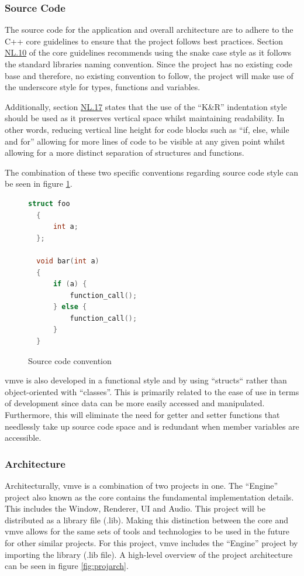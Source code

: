 \documentclass[11pt]{article}
\begin{document}
\subsubsection{Source Code}
The source code for the application and overall architecture are to adhere to
the C++ core guidelines \cite{cpp-guidelines} to ensure that the project follows
best practices. Section
\href{http://isocpp.github.io/CppCoreGuidelines/CppCoreGuidelines#nl10-prefer-underscore_style-names}{NL.10}
of the core guidelines recommends using the snake case style as it follows the
standard libraries naming convention. Since the project has no existing code
base and therefore, no existing convention to follow, the project will make use
of the underscore style for types, functions and variables. 

Additionally, section
\href{https://isocpp.github.io/CppCoreGuidelines/CppCoreGuidelines#nl17-use-kr-derived-layout}{NL.17}
states that the use of the ``K\&R''  indentation style \cite{indentation} should
be used as it preserves vertical space whilst maintaining readability. In other
words, reducing vertical line height for code blocks such as ``if, else, while
and for'' allowing for more lines of code to be visible at any given point
whilst allowing for a more distinct separation of structures and functions.

The combination of these two specific conventions regarding source code style
can be seen in figure \ref{fig:convention}.

\begin{figure}[H]
\centering
\begin{lstlisting}[language=C++]
  struct foo
  {
      int a;
  };

  void bar(int a)
  {
      if (a) {
          function_call();
      } else {
          function_call();
      }
  }
\end{lstlisting}
\caption{Source code convention}
\label{fig:convention}
\end{figure}

\gls*{vmve} is also developed in a functional style and by using ``structs``
rather than object-oriented with ``classes''. This is primarily related to
the ease of use in terms of development since data can be more easily accessed
and manipulated. Furthermore, this will eliminate the need for getter and setter
functions that needlessly take up source code space and is redundant when member
variables are accessible.

\subsubsection{Architecture}
Architecturally, \gls*{vmve} is a combination of two projects in one. The
``Engine'' project also known as the core contains the fundamental
implementation details. This includes the Window, Renderer, UI and Audio. This
project will be distributed as a library file (.lib). Making this distinction
between the core and \gls*{vmve} allows for the same sets of tools and
technologies to be used in the future for other similar projects. For this
project, \gls*{vmve} includes the ``Engine'' project by importing the library
(.lib file). A high-level overview of the project architecture can be seen in
figure \ref{fig:projarch}.
\end{document}
